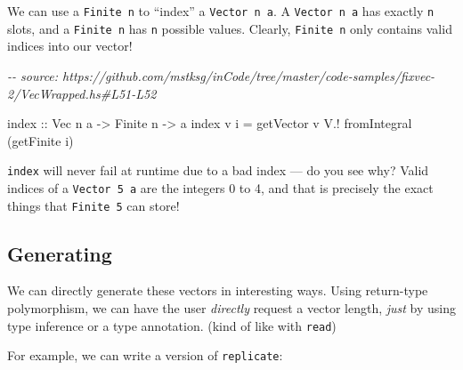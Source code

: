 \documentclass[]{article}
\newenvironment{Shaded}{}{}
\newcommand{\CommentTok}[1]{\textcolor[rgb]{0.38,0.63,0.69}{\textit{#1}}}
\newcommand{\DataTypeTok}[1]{\textcolor[rgb]{0.56,0.13,0.00}{#1}}
\newcommand{\FunctionTok}[1]{\textcolor[rgb]{0.02,0.16,0.49}{#1}}
\newcommand{\KeywordTok}[1]{\textcolor[rgb]{0.00,0.44,0.13}{\textbf{#1}}}
\newcommand{\NormalTok}[1]{#1}
\newcommand{\OperatorTok}[1]{\textcolor[rgb]{0.40,0.40,0.40}{#1}}
\newcommand{\OtherTok}[1]{\textcolor[rgb]{0.00,0.44,0.13}{#1}}
\begin{document}
We can use a \texttt{Finite\ n} to ``index'' a \texttt{Vector\ n\ a}. A
\texttt{Vector\ n\ a} has exactly \texttt{n} slots, and a \texttt{Finite\ n} has
\texttt{n} possible values. Clearly, \texttt{Finite\ n} only contains valid
indices into our vector!

\begin{Shaded}
\begin{Highlighting}[]
\CommentTok{{-}{-} source: https://github.com/mstksg/inCode/tree/master/code{-}samples/fixvec{-}2/VecWrapped.hs\#L51{-}L52}

\FunctionTok{index}\OtherTok{ ::} \DataTypeTok{Vec}\NormalTok{ n a }\OtherTok{{-}\textgreater{}} \DataTypeTok{Finite}\NormalTok{ n }\OtherTok{{-}\textgreater{}}\NormalTok{ a}
\FunctionTok{index}\NormalTok{ v i }\OtherTok{=}\NormalTok{ getVector v }\OperatorTok{V.!} \FunctionTok{fromIntegral}\NormalTok{ (getFinite i)}
\end{Highlighting}
\end{Shaded}

\texttt{index} will never fail at runtime due to a bad index --- do you see why?
Valid indices of a \texttt{Vector\ 5\ a} are the integers 0 to 4, and that is
precisely the exact things that \texttt{Finite\ 5} can store!

\subsection{Generating}\label{generating}

We can directly generate these vectors in interesting ways. Using return-type
polymorphism, we can have the user \emph{directly} request a vector length,
\emph{just} by using type inference or a type annotation. (kind of like with
\texttt{read})

For example, we can write a version of \texttt{replicate}:

\begin{Shaded}
\end{Shaded}
\end{document}

